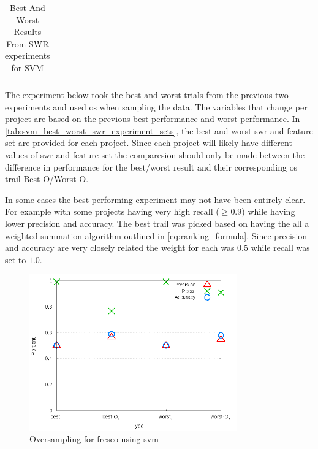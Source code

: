 \begin{table}[ht]
\begin{center}
\begin{tabular}{|c|c|c|c|c|}

        \hline
    \end{tabular}
    \caption{Best And Worst Results From SWR experiments for SVM}
    \label{tab:svm_best_worst_swr_experiment_sets}
\end{center}
\end{table}

The experiment below took the best and worst trials from the previous two experiments and used \gls{os} when sampling the data. The variables that change per project are based on the previous best performance and worst performance. In \autoref{tab:svm_best_worst_swr_experiment_sets}, the best and worst \gls{swr} and feature set are provided for each project. Since each project will likely have different values of \gls{swr} and feature set the comparesion should only be made between the difference in performance for the best/worst result and their corresponding \gls{os} trail Best-O/Worst-O.

In some cases the best performing experiment may not have been entirely clear. For example with some projects having very high recall ($ \geq 0.9$) while having lower precision and accuracy. The best trail was picked based on having the all a weighted summation algorithm outlined in \autoref{eq:ranking_formula}. Since precision and accuracy are very closely related the weight for each was $0.5$ while recall was set to $1.0$.


\begin{figure}[!t]
    \centering
        \includegraphics[width=0.8\textwidth]{images/svm/test_4/fresco_sample_range}
        \caption{Oversampling for fresco using \gls{svm}}
        \label{fig:test_4_fresco_svm}
\end{figure}

